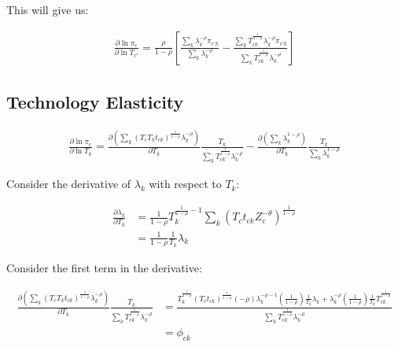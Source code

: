\documentclass[10pt]{article}
\begin{document}
This will give us:

\begin{align*}
    \frac{\partial \ln \pi_c}{\partial \ln T_{c'}} = \frac{\rho}{1 - \rho} \left[ \frac{\sum_{k}^{} \lambda_k^{- \rho} \pi_{c'k}}{\sum_{k}^{} \lambda_k^{- \rho}} - \frac{\sum_{k}^{} T_{ck}^{\frac{1}{1 - \rho}} \lambda_k^{-\rho} \pi_{c'k}}{\sum_{k}^{} T_{ck}^{\frac{1}{1 - \rho}} \lambda_k^{-\rho}} \right]
\end{align*}

\subsection{Technology Elasticity}

\begin{align*}
    \frac{\partial \ln \pi_c}{\partial \ln T_k} = \frac{\partial \left( \sum_{k}^{} (T_c T_k t_{ck})^{\frac{1}{1 - \rho}} \lambda_k^{- \rho} \right)}{\partial T_k} \frac{T_k}{\sum_{k}^{} T_{ck}^{\frac{1}{1 - \rho}} \lambda_k^{- \rho}} - \frac{\partial \left( \sum_{k}^{} \lambda_k^{1 - \rho} \right)}{\partial T_k} \frac{T_k}{\sum_{k}^{} \lambda_k^{1 - \rho}}
\end{align*}

Consider the derivative of $\lambda_k$ with respect to $T_k$:

\begin{align*}
    \frac{\partial \lambda_k}{\partial T_k} & = \frac{1}{1 - \rho} T_k^{\frac{1}{1 -\rho} - 1} \sum_{k}^{} (T_c t_{ck} Z_c^{- \theta})^{\frac{1}{1 - \rho}} \\
                                            & =\frac{1}{1 - \rho} \frac{1}{T_k} \lambda_k
\end{align*}

Consider the first term in the derivative:

\begin{align*}
    \frac{\partial \left( \sum_{k}^{} (T_c T_k t_{ck})^{\frac{1}{1 - \rho}} \lambda_k^{- \rho} \right)}{\partial T_k} \frac{T_k}{\sum_{k}^{} T_{ck}^{\frac{1}{1 - \rho}} \lambda_k^{- \rho}} & = \frac{T_k^{\frac{1}{1 - \rho}} (T_c t_{ck})^{\frac{1}{1 - \rho}} (- \rho) \lambda_k^{- \rho - 1} \left( \frac{1}{1 - \rho} \right) \frac{1}{T_k} \lambda_k + \lambda_k^{- \rho} \left( \frac{1}{1 - \rho} \right) \frac{1}{T_k} T_{ck}^{\frac{1}{1 - \rho}}}{\sum_{k}^{} T_{ck}^{\frac{1}{1 - \rho}} \lambda_k^{- \rho}} \\
                                                                                                                                                                                             & = \phi_{ck}
\end{align*}
\end{document}
